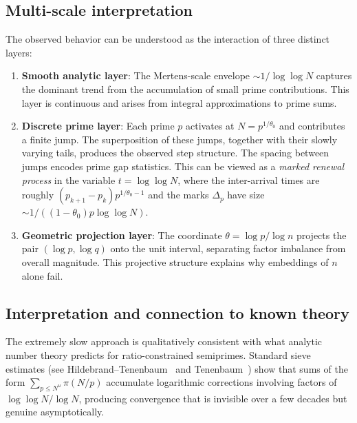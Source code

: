 \documentclass[11pt]{article}
\theoremstyle{definition}
\begin{document}
\subsection{Multi-scale interpretation}

The observed behavior can be understood as the interaction of three distinct layers:

\begin{enumerate}[label=(\arabic*), leftmargin=*]
  \item \textbf{Smooth analytic layer}: The Mertens-scale envelope
        \(\sim 1/\log\log N\) captures the dominant trend from the accumulation of
        small prime contributions.  This layer is continuous and arises from
        integral approximations to prime sums.

  \item \textbf{Discrete prime layer}: Each prime \(p\) activates at
        \(N = p^{1/\theta_0}\) and contributes a finite jump.  The superposition of
        these jumps, together with their slowly varying tails, produces the observed
        step structure.  The spacing between jumps encodes prime gap statistics.
        This can be viewed as a \emph{marked renewal process} in the variable
        \(t = \log\log N\), where the inter-arrival times are roughly
        \((p_{k+1}-p_k)p^{1/\theta_0-1}\) and the marks \(\Delta_p\) have size
        \(\sim 1/((1-\theta_0)p\log\log N)\).

  \item \textbf{Geometric projection layer}: The coordinate
        \(\theta = \log p / \log n\) projects the pair \((\log p, \log q)\) onto the
        unit interval, separating factor imbalance from overall magnitude.  This
        projective structure explains why embeddings of \(n\) alone fail.
\end{enumerate}

\subsection{Interpretation and connection to known theory}

The extremely slow approach is qualitatively consistent with what analytic number
theory predicts for ratio-constrained semiprimes.  Standard sieve estimates
(see Hildebrand--Tenenbaum~\cite{hildebrand1993} and Tenenbaum~\cite{tenenbaum1995})
show that sums of the form \(\sum_{p \leq N^u} \pi(N/p)\) accumulate logarithmic
corrections involving factors of \(\log\log N / \log N\), producing convergence that
is invisible over a few decades but genuine asymptotically.
\end{document}
